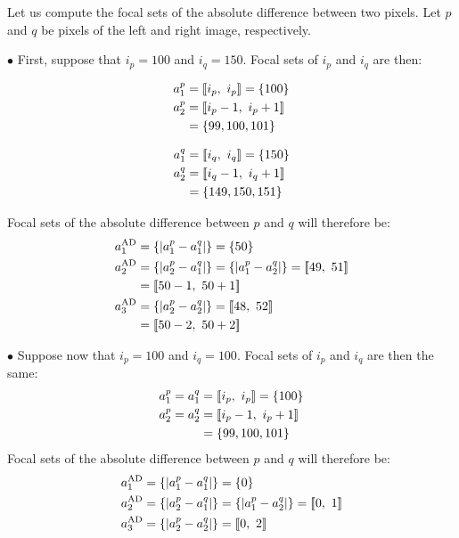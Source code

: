 \begin{example}\label{ex:ad_numerical_example}
    Let us compute the focal sets of the absolute difference between two pixels. Let $p$ and $q$ be pixels of the left and right image, respectively.
    
    $\bullet$ First, suppose that $i_p=100$ and $i_q=150$. Focal sets of $i_p$ and $i_q$ are then:\newline\medskip
    \begin{minipage}{0.5\linewidth}
    	\begin{align*}
    		a^p_1&=[\![ i_p,~i_p]\!]= \{100\}\\
    		a^p_2&=[\![ i_p-1,~i_p+1]\!]\\
    		&= \{99, 100, 101\}
    	\end{align*}
    \end{minipage}
    \begin{minipage}{0.5\linewidth}
    	\begin{align*}
    		a^q_1&=[\![ i_q,~i_q]\!]= \{150\}\\
    		a^q_2&=[\![ i_q-1,~i_q+1]\!]\\
    		&= \{149, 150, 151\}
    	\end{align*}
    \end{minipage}\bigskip\newline
    Focal sets of the absolute difference between $p$ and $q$ will therefore be:
    \begin{align*}
        a^\AD_1&=\{|a^p_1-a^q_1|\}=\{50\}\\
        a^\AD_2&=\{|a^p_2-a^q_1|\}=\{|a^p_1-a^q_2|\}=\opi49, ~51\cli\\
        &=\opi50-1, ~50+1\cli\\
        a^\AD_3&=\{|a^p_2-a^q_2|\}=\opi48,~52\cli\\
        &= \opi50-2, ~50+2\cli
    \end{align*}
    
    $\bullet$ Suppose now that $i_p=100$ and $i_q=100$. Focal sets of $i_p$ and $i_q$ are then the same:
    	\begin{align*}
    		a^p_1=a^q_1&=[\![ i_p,~i_p]\!]= \{100\}\\
    		a^p_2=a^q_2&=[\![ i_p-1,~i_p+1]\!]\\
    		&= \{99, 100, 101\}
    	\end{align*}
    Focal sets of the absolute difference between $p$ and $q$ will therefore be:
    \begin{align*}
        &a^{\mathrm{AD}}_1=\{|a^p_1-a^q_1|\}=\{0\}\\
        &a^{\mathrm{AD}}_2=\{|a^p_2-a^q_1|\}=\{|a^p_1-a^q_2|\}=[\![0, ~1]\!]\\
        &a^{\mathrm{AD}}_3=\{|a^p_2-a^q_2|\}=[\![0,~2]\!]
    \end{align*}
\end{example}


